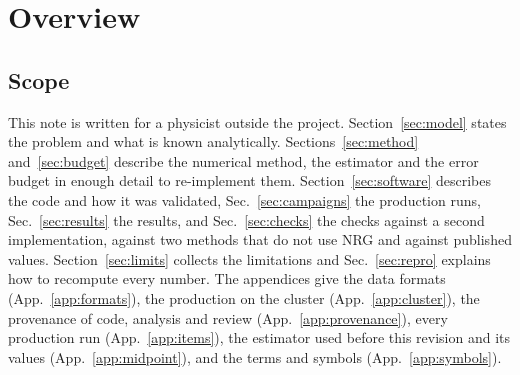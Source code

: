 \documentclass[10pt,a4paper]{article}
\newcommand{\DE}{\Delta_E}
\newcommand{\code}[1]{\texttt{#1}}
\begin{document}
\begin{abstract}
by at most $\nrgmcAccDiffMax$. That is within the sum of the Monte Carlo statistical error, its fit-model half-range and the NRG
error at $\nrgmcAccWithinLin$ points, and $\nrgmcAccRatioMax$ times that sum at the fifth; but it is up to $\nrgmcAccStatRatioMax$
Monte Carlo statistical errors, with the same sign at neighboring points, so only the fit-model half-range reconciles the two. The
Monte Carlo crossing extrapolations agree with NRG within $\nrgmcCrossStatMax$ of their statistical errors at these points. A second
solver, written by a separate Claude agent from a physics-only specification, reproduces the chain coefficients to better than
$\nrgindChain$ (rounding level), the critical couplings bitwise or to $\nrgindAlpha$, and $\DE$ to $\nrgindDE$ in every window its
finite differences can reach. The code was written by GPT-6 astra (OpenAI) and ported to the cluster, run and analyzed by Claude Code
(Anthropic); every number in this note is regenerated from the released records by \code{make replay}.
\end{abstract}

\tableofcontents
\clearpage

\section{Overview}\label{sec:overview}
\subsection{Scope}
This note is written for a physicist outside the project. Section~\ref{sec:model} states the problem and what is known analytically.
Sections~\ref{sec:method} and~\ref{sec:budget} describe the numerical method, the estimator and the error budget in enough detail to
re-implement them. Section~\ref{sec:software} describes the code and how it was validated, Sec.~\ref{sec:campaigns} the production
runs, Sec.~\ref{sec:results} the results, and Sec.~\ref{sec:checks} the checks against a second implementation, against two methods
that do not use NRG and against published values. Section~\ref{sec:limits} collects the limitations and Sec.~\ref{sec:repro}
explains how to recompute every number. The appendices give the data formats (App.~\ref{app:formats}), the production on the
cluster (App.~\ref{app:cluster}), the provenance of code, analysis and review (App.~\ref{app:provenance}), every production run
(App.~\ref{app:items}), the estimator used before this revision and its values (App.~\ref{app:midpoint}), and the terms and symbols
(App.~\ref{app:symbols}).
\end{document}
